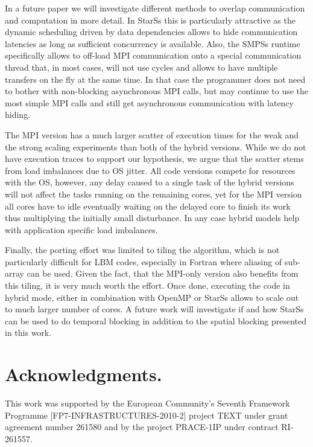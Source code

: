\documentclass[conference]{IEEEtran}
\newcommand{\starss}{{StarSs}}
\newcommand{\smpss}{{SMPSs}}
\begin{document}
In a future paper we will investigate different methods to overlap
communication and computation in more detail. In \starss{} this is
particularly attractive as the dynamic scheduling driven by data
dependencies allows to hide communication latencies as long as
sufficient concurrency is available. Also, the \smpss{} runtime
specifically allows to off-load MPI communication onto a special
communication thread \cite{MLAV10} that, in most cases, will not use
cycles and allows to have multiple transfers on the fly at the same
time. In that case the programmer does not need to bother with
non-blocking asynchronous MPI calls, but may continue to use the most
simple MPI calls and still get asynchronous communication with latency
hiding.

The MPI version has a much larger scatter of execution
times for the weak and the strong scaling experiments than both of the
hybrid versions. While we do not have execution traces to support our
hypothesis, we argue that the scatter stems from load imbalances due
to OS jitter. All code versions compete for resources with the OS,
however, any delay caused to a single task of the hybrid versions will
not affect the tasks running on the remaining cores, yet for the MPI
version all cores have to idle eventually waiting on the delayed core
to finish its work thus multiplying the initially small disturbance.   
In any case hybrid models help with application specific load
imbalances.

Finally, the porting effort was limited to tiling the algorithm, which
is not particularly difficult for LBM codes, especially in Fortran
where aliasing of sub-array can be used. Given the fact, that the
MPI-only version also benefits from this tiling, it is very much worth the
effort. Once done, executing the code in hybrid mode, either in
combination with OpenMP or \starss{} allows to scale out to much
larger number of cores. A future work will investigate if and how
\starss{} can be used to do temporal blocking in addition to the spatial
blocking presented in this work.


\section{Acknowledgments. }
\begin{sloppypar}
This work was supported by the European Community's Seventh Framework
Programme [FP7-INFRASTRUCTURES-2010-2] project TEXT under grant
agreement number 261580 and by the project PRACE-1IP under contract RI-261557.
\end{sloppypar}



\end{document}
